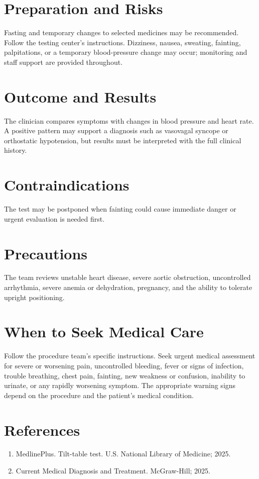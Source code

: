 \section*{Preparation and Risks}
Fasting and temporary changes to selected medicines may be recommended. Follow the testing center's instructions. Dizziness, nausea, sweating, fainting, palpitations, or a temporary blood-pressure change may occur; monitoring and staff support are provided throughout.

\section*{Outcome and Results}
The clinician compares symptoms with changes in blood pressure and heart rate. A positive pattern may support a diagnosis such as vasovagal syncope or orthostatic hypotension, but results must be interpreted with the full clinical history.

\section*{Contraindications}
The test may be postponed when fainting could cause immediate danger or urgent evaluation is needed first.

\section*{Precautions}
The team reviews unstable heart disease, severe aortic obstruction, uncontrolled arrhythmia, severe anemia or dehydration, pregnancy, and the ability to tolerate upright positioning.

\section*{When to Seek Medical Care}
Follow the procedure team's specific instructions. Seek urgent medical assessment for severe or worsening pain, uncontrolled bleeding, fever or signs of infection, trouble breathing, chest pain, fainting, new weakness or confusion, inability to urinate, or any rapidly worsening symptom. The appropriate warning signs depend on the procedure and the patient's medical condition.

\section*{References}
\begin{enumerate}
  \item MedlinePlus. Tilt-table test. U.S. National Library of Medicine; 2025.
  \item Current Medical Diagnosis and Treatment. McGraw-Hill; 2025.
\end{enumerate}
\clearpage
